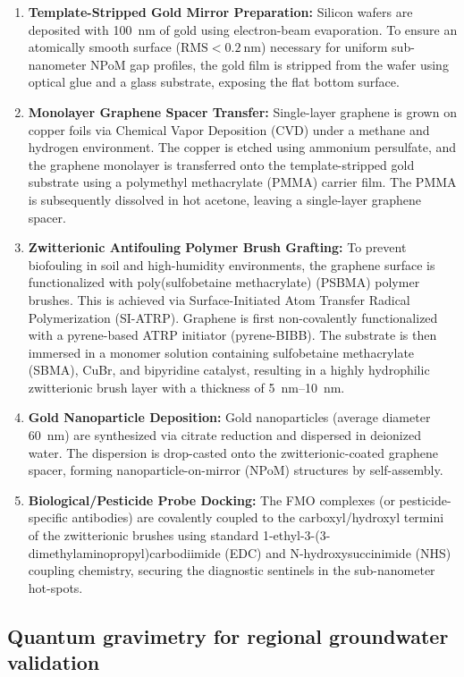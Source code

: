 \documentclass[11pt,a4paper]{article}
\begin{document}
\begin{enumerate}[nosep]
\item \textbf{Template-Stripped Gold Mirror Preparation:} Silicon wafers are deposited with \qty{100}{\nm} of gold using electron-beam evaporation. To ensure an atomically smooth surface ($\mathrm{RMS} < \qty{0.2}{\nm}$) necessary for uniform sub-nanometer NPoM gap profiles, the gold film is stripped from the wafer using optical glue and a glass substrate, exposing the flat bottom surface.
\item \textbf{Monolayer Graphene Spacer Transfer:} Single-layer graphene is grown on copper foils via Chemical Vapor Deposition (CVD) under a methane and hydrogen environment. The copper is etched using ammonium persulfate, and the graphene monolayer is transferred onto the template-stripped gold substrate using a polymethyl methacrylate (PMMA) carrier film. The PMMA is subsequently dissolved in hot acetone, leaving a single-layer graphene spacer.
\item \textbf{Zwitterionic Antifouling Polymer Brush Grafting:} To prevent biofouling in soil and high-humidity environments, the graphene surface is functionalized with poly(sulfobetaine methacrylate) (PSBMA) polymer brushes. This is achieved via Surface-Initiated Atom Transfer Radical Polymerization (SI-ATRP). Graphene is first non-covalently functionalized with a pyrene-based ATRP initiator (pyrene-BIBB). The substrate is then immersed in a monomer solution containing sulfobetaine methacrylate (SBMA), CuBr, and bipyridine catalyst, resulting in a highly hydrophilic zwitterionic brush layer with a thickness of \qtyrange{5}{10}{\nm}.
\item \textbf{Gold Nanoparticle Deposition:} Gold nanoparticles (average diameter \qty{60}{\nm}) are synthesized via citrate reduction and dispersed in deionized water. The dispersion is drop-casted onto the zwitterionic-coated graphene spacer, forming nanoparticle-on-mirror (NPoM) structures by self-assembly.
\item \textbf{Biological/Pesticide Probe Docking:} The FMO complexes (or pesticide-specific antibodies) are covalently coupled to the carboxyl/hydroxyl termini of the zwitterionic brushes using standard 1-ethyl-3-(3-dimethylaminopropyl)carbodiimide (EDC) and N-hydroxysuccinimide (NHS) coupling chemistry, securing the diagnostic sentinels in the sub-nanometer hot-spots.
\end{enumerate}

\subsection{Quantum gravimetry for regional groundwater validation}
\label{SI-sec:gravimetry}
\end{document}
